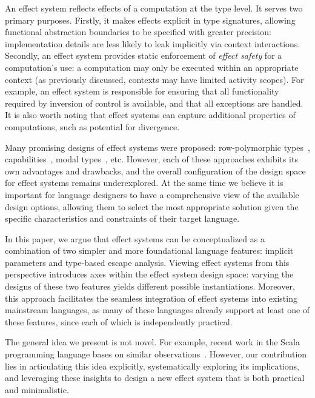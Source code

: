 \documentclass[acmsmall,review,screen]{acmart}
\begin{document}
An effect system reflects effects of a computation at the type level.
It serves two primary purposes.
Firstly, it makes effects explicit in type signatures, allowing functional abstraction boundaries to be specified with greater precision: implementation details are less likely to leak implicitly via context interactions.
Secondly, an effect system provides static enforcement of \textit{effect safety} for a computation’s use: a computation may only be executed within an appropriate context (as previously discussed, contexts may have limited activity scopes).
For example, an effect system is responsible for ensuring that all functionality required by inversion of control is available, and that all exceptions are handled.
It is also worth noting that effect systems can capture additional properties of computations, such as potential for divergence.

Many promising designs of effect systems were proposed: row-polymorphic types~\cite{leijen2014koka}, capabilities~\cite{brachthauser2022effects, boruch2023capturing}, modal types~\cite{tang2025modal}, etc.
However, each of these approaches exhibits its own advantages and drawbacks, and the overall configuration of the design space for effect systems remains underexplored.
At the same time we believe it is important for language designers to have a comprehensive view of the available design options, allowing them to select the most appropriate solution given the specific characteristics and constraints of their target language.

In this paper, we argue that effect systems can be conceptualized as a combination of two simpler and more foundational language features: implicit parameters and type-based escape analysis.
Viewing effect systems from this perspective introduces axes within the effect system design space: varying the designs of these two features yields different possible instantiations.
Moreover, this approach facilitates the seamless integration of effect systems into existing mainstream languages, as many of these languages already support at least one of these features, since each of which is independently practical.

The general idea we present is not novel.
For example, recent work in the Scala programming language bases on similar observations~\cite{odersky2021safer, boruch2023capturing}.
However, our contribution lies in articulating this idea explicitly, systematically exploring its implications, and leveraging these insights to design a new effect system that is both practical and minimalistic.
\end{document}
